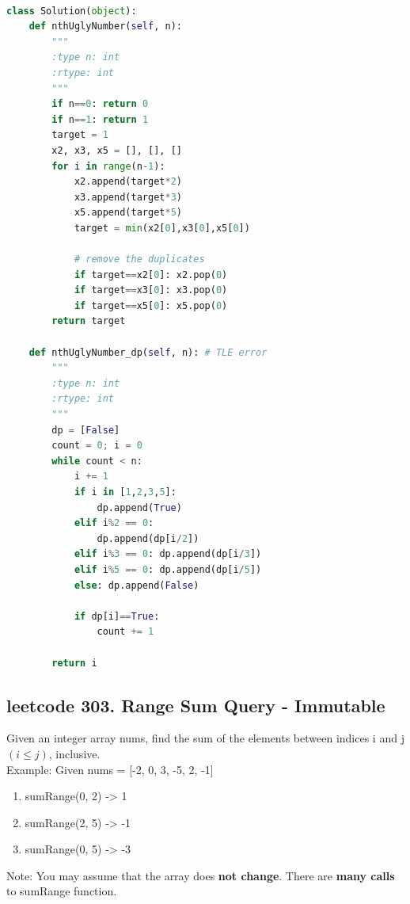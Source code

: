 \documentclass[a4paper,10pt]{article}
\begin{document}
\begin{lstlisting}[language=Python, caption=Problem264. Ugly Number II]

class Solution(object):
    def nthUglyNumber(self, n):
        """
        :type n: int
        :rtype: int
        """
        if n==0: return 0
        if n==1: return 1
        target = 1
        x2, x3, x5 = [], [], []
        for i in range(n-1):
            x2.append(target*2)
            x3.append(target*3)
            x5.append(target*5)
            target = min(x2[0],x3[0],x5[0])
            
            # remove the duplicates
            if target==x2[0]: x2.pop(0)
            if target==x3[0]: x3.pop(0)
            if target==x5[0]: x5.pop(0)
        return target
        
    def nthUglyNumber_dp(self, n): # TLE error
        """
        :type n: int
        :rtype: int
        """
        dp = [False]
        count = 0; i = 0
        while count < n:
            i += 1
            if i in [1,2,3,5]:
                dp.append(True)
            elif i%2 == 0: 
                dp.append(dp[i/2])
            elif i%3 == 0: dp.append(dp[i/3])
            elif i%5 == 0: dp.append(dp[i/5])
            else: dp.append(False)
            
            if dp[i]==True:
                count += 1
            
        return i

\end{lstlisting}


\subsection{leetcode 303. Range Sum Query - Immutable}
Given an integer array nums, find the sum of the elements between indices i and j $(i \leq j)$, inclusive. \\

\noindent Example: Given nums = [-2, 0, 3, -5, 2, -1]
\begin{enumerate}
    \item sumRange(0, 2) -> 1
    \item sumRange(2, 5) -> -1
    \item sumRange(0, 5) -> -3 \\
\end{enumerate}

\noindent Note: You may assume that the array does \textbf{not change}. There are \textbf{many calls} to sumRange function. \\
\end{document}
